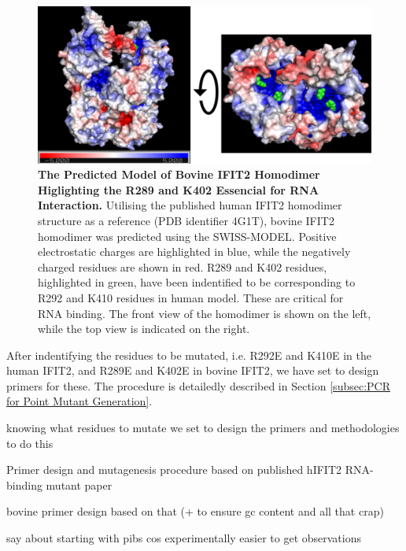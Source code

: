\begin{figure}
    \centering
    \includegraphics[width=1\linewidth]{09. Chapter 4/Figs/01. pIB/03. IFIT2/05. IFIT2-RNA binding mutant/01. Structure/01. structure.png}
    \caption[The Predicted Model of Bovine IFIT2 Homodimer Higlighting the R289 and K402 Essencial for RNA Interaction.]{\textbf{The Predicted Model of Bovine IFIT2 Homodimer Higlighting the R289 and K402 Essencial for RNA Interaction.} Utilising the published human IFIT2 homodimer structure as a reference (PDB identifier 4G1T), bovine IFIT2 homodimer was predicted using the SWISS-MODEL. Positive electrostatic charges are highlighted in blue, while the negatively charged residues are shown in red. R289 and K402 residues, highlighted in green, have been indentified to be corresponding to R292 and K410 residues in human model. These are critical for RNA binding. The front view of the homodimer is shown on the left, while the top view is indicated on the right.}
    \label{fig:ifit2 mutant structure}
\end{figure}

After indentifying the residues to be mutated, i.e. R292E and K410E in the human IFIT2, and R289E and K402E in bovine IFIT2, we have set to design primers for these. The procedure is detailedly described in Section \ref{subsec:PCR for Point Mutant Generation}. 

knowing what residues to mutate we set to design the primers and methodologies to do this


Primer design and mutagenesis procedure based on published hIFIT2 RNA-binding mutant paper
\cite{Tran2020InfluenzaMRNAs}

bovine primer design based on that (+ to ensure gc content and all that crap)

say about starting with pibs cos experimentally easier to get observations


